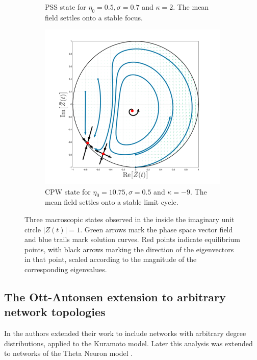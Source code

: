 \begin{figure}[H]
\begin{subfigure}[b]{0.32\linewidth}
   \caption{PSS state for $\eta_0 = 0.5, \sigma = 0.7$ and $\kappa= 2$. The mean field settles onto a stable focus.}
   \label{fig:MFRPSS}
\end{subfigure} \hfill
\begin{subfigure}[b]{0.32\linewidth}
   \centering
  \includegraphics[width=\linewidth, trim={2cm 1cm 2cm 1.5cm },clip]{../Figures/PhaseSpace/MFRCPW.png}
   \caption{CPW state for $\eta_0 = 10.75, \sigma = 0.5$ and $\kappa= -9$. The mean field settles onto a stable limit cycle.}
   \label{fig:MFRCPW}
\end{subfigure}
   \caption{Three macroscopic states observed in the \MFR inside the imaginary unit circle $|Z(t)| = 1$. Green arrows mark the phase space vector field and blue trails mark solution curves. Red points indicate equilibrium points, with black arrows marking the direction of the eigenvectors in that point, scaled according to the magnitude of the corresponding eigenvalues.}
   \label{fig:macroscopicstatesfixeddegree}
\end{figure}



\subsection{The Ott-Antonsen extension to arbitrary network topologies}
In \cite{Restrepo2014} the authors extended their work to include networks with arbitrary degree distributions, applied to the Kuramoto model. Later this analysis was extended to networks of the Theta Neuron model \cite{OttAntonsen2017}. \\

